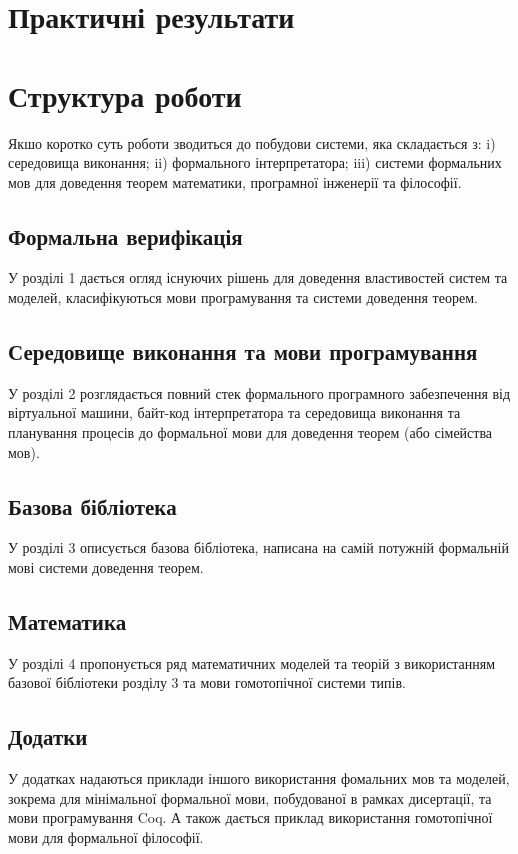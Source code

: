\section*{Практичні результати}

\section*{Структура роботи}

Якшо коротко суть роботи зводиться до побудови системи, яка складається з:
i) середовища виконання; ii) формального інтерпретатора; iii) системи формальних мов
для доведення теорем математики, програмної інженерії та філософії.

\subsection*{Формальна верифікація}

У розділі 1 дається огляд існуючих рішень для доведення
властивостей систем та моделей, класифікуються мови програмування
та системи доведення теорем.

\subsection*{Середовище виконання та мови програмування}

У розділі 2 розглядається повний стек формального програмного забезпечення
від віртуальної машини, байт-код інтерпретатора та середовища виконання
та планування процесів до формальної мови для доведення теорем (або сімейства мов).

\subsection*{Базова бібліотека}

У розділі 3 описується базова бібліотека, написана на самій потужній
формальній мові системи доведення теорем.

\subsection*{Математика}

У розділі 4 пропонується ряд математичних моделей та теорій з використанням
базової бібліотеки розділу 3 та мови гомотопічної системи типів.

\subsection*{Додатки}

У додатках надаються приклади іншого використання фомальних мов та моделей,
зокрема для мінімальної формальної мови, побудованої в рамках дисертації,
та мови програмування Coq. А також дається приклад використання
гомотопічної мови для формальної філософії.

